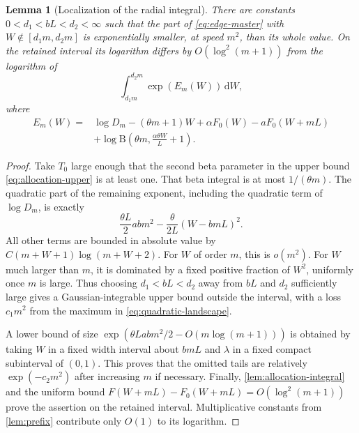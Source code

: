 \documentclass[11pt,a4paper]{article}
\numberwithin{equation}{section}
\newtheorem{lemma}[lemma]{Lemma}
\theoremstyle{definition}\newaliascnt{definition}{theorem}
\theoremstyle{remark}\newaliascnt{remark}{theorem}
\newcommand{\dd}{\,\mathrm d}
\newcommand{\Bf}{\mathrm B}
\begin{document}
\begin{lemma}[Localization of the radial integral]
\label{lem:localization}
There are constants $0<d_1<bL<d_2<\infty$ such that the part of
\eqref{eq:edge-master} with $W\notin[d_1m,d_2m]$ is exponentially smaller,
at speed $m^2$, than its whole value. On the retained interval its logarithm
differs by $O(\log^2(m+1))$ from the logarithm of
\begin{equation}
 \int_{d_1m}^{d_2m}\exp(E_m(W))\dd W,
 \label{eq:Em-integral}
\end{equation}
where
\begin{align}
 E_m(W)={}&\log D_m-(\theta m+1)W
       +\alpha F_0(W)-aF_0(W+mL)\nonumber\\
       &+\log\Bf\left(\theta m,\frac{\alpha\theta W}{L}+1\right).
 \label{eq:Em}
\end{align}
\end{lemma}
\begin{proof}
Take $T_0$ large enough that the second beta parameter in the upper bound
\eqref{eq:allocation-upper} is at least one. That beta integral is at most
$1/(\theta m)$. The quadratic part of the remaining exponent, including the
quadratic term of $\log D_m$, is exactly
\begin{equation}
 \frac{\theta L}{2}abm^2
             -\frac{\theta}{2L}(W-bmL)^2.
 \label{eq:quadratic-landscape}
\end{equation}
All other terms are bounded in absolute value by
$C(m+W+1)\log(m+W+2)$. For $W$ of order $m$, this is $o(m^2)$.
For $W$ much larger than $m$, it is dominated by a fixed positive fraction of
$W^2$, uniformly once $m$ is large. Thus choosing $d_1<bL<d_2$ away from
$bL$ and $d_2$ sufficiently large gives a Gaussian-integrable upper bound
outside the interval, with a loss $c_1m^2$ from the maximum in
\eqref{eq:quadratic-landscape}.

A lower bound of size
$\exp(\theta Labm^2/2-O(m\log(m+1)))$ is obtained by taking $W$ in a fixed
width interval about $bmL$ and $\lambda$ in a fixed compact subinterval of
$(0,1)$. This proves that the omitted tails are relatively
$\exp(-c_2m^2)$ after increasing $m$ if necessary. Finally,
\cref{lem:allocation-integral} and the uniform bound
$F(W+mL)-F_0(W+mL)=O(\log^2(m+1))$ prove the assertion on the retained
interval. Multiplicative constants from \cref{lem:prefix} contribute only
$O(1)$ to its logarithm.
\end{proof}
\end{document}

